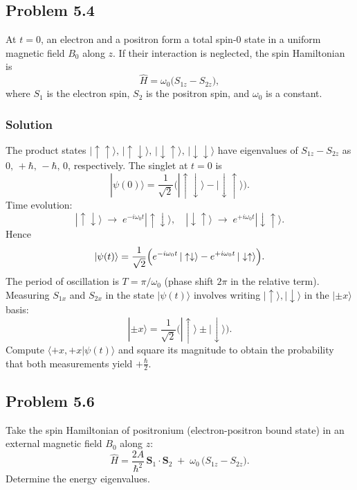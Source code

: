 \documentclass[twocolumn]{article}
\begin{document}
\begin{spacing}{1}
\subsection{Problem 5.4}
At $t=0$, an electron and a positron form a total spin-$0$ state in a uniform magnetic field $B_0$ along $z$. If their interaction is neglected, the spin Hamiltonian is
\[
\hat{H} = \omega_0\bigl(S_{1z} - S_{2z}\bigr),
\]
where $S_1$ is the electron spin, $S_2$ is the positron spin, and $\omega_0$ is a constant.

\subsubsection*{Solution}
The product states $|\uparrow\uparrow\rangle,\,|\uparrow\downarrow\rangle,\,|\downarrow\uparrow\rangle,\,|\downarrow\downarrow\rangle$ have eigenvalues of $S_{1z}-S_{2z}$ as $0,\,+\hbar,\,-\hbar,\,0$, respectively. The singlet at $t=0$ is
\[
|\psi(0)\rangle 
= \frac{1}{\sqrt{2}}\bigl(|\uparrow\downarrow\rangle - |\downarrow\uparrow\rangle\bigr).
\]
Time evolution:
\[
|\uparrow\downarrow\rangle \;\longrightarrow\; e^{-i\omega_0 t}|\uparrow\downarrow\rangle,
\quad
|\downarrow\uparrow\rangle \;\longrightarrow\; e^{+i\omega_0 t}|\downarrow\uparrow\rangle.
\]
Hence
\[
|\psi(t)\rangle 
= \frac{1}{\sqrt{2}}
\Bigl(
e^{-i\omega_0 t}\,|\uparrow\downarrow\rangle 
- e^{+i\omega_0 t}\,|\downarrow\uparrow\rangle
\Bigr).
\]
The period of oscillation is $T = \pi/\omega_0$ (phase shift $2\pi$ in the relative term). Measuring $S_{1x}$ and $S_{2x}$ in the state $|\psi(t)\rangle$ involves writing $|\uparrow\rangle,|\downarrow\rangle$ in the $|\pm x\rangle$ basis:
\[
|\pm x\rangle 
= \frac{1}{\sqrt{2}}\bigl(|\uparrow\rangle \pm |\downarrow\rangle\bigr).
\]
Compute $\langle +x,+x|\psi(t)\rangle$ and square its magnitude to obtain the probability that both measurements yield $+\tfrac{\hbar}{2}$.

\subsection{Problem 5.6}
Take the spin Hamiltonian of positronium (electron-positron bound state) in an external magnetic field $B_0$ along $z$:
\[
\hat{H}
= \frac{2A}{\hbar^2}\,\mathbf{S}_1\cdot\mathbf{S}_2
\;+\;
\omega_0\,\bigl(S_{1z} - S_{2z}\bigr).
\]
Determine the energy eigenvalues.


\end{spacing}
\end{document}
